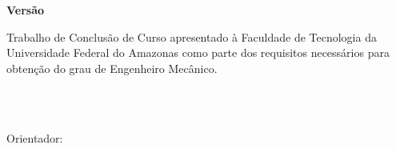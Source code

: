 
\thispagestyle{empty}
\begin{titlepage}
\begin{center}
\MakeUppercase{\AUTOR}\\ %
\vspace{2.5cm}
\large{\textbf{\TITULO}}\\ %
\vspace{2cm}
\normalsize{\textbf{Versão \VERSAO}} %
\vspace{2cm}
\end{center}

\begin{flushright}
\begin{minipage}{0.6\textwidth}
{\noindent Trabalho de Conclusão de Curso apresentado à Faculdade de Tecnologia da Universidade Federal do Amazonas como parte dos requisitos necessários para obtenção do grau de Engenheiro Mecânico.} %
\\ \\
\end{minipage}
\end{flushright}

\begin{minipage}{0.69\textwidth}
\end{minipage}
\\

\hspace{.2\textwidth} %
\begin{minipage}{0.69\textwidth}
{Orientador: \ORIENTADOR}\\
\end{minipage}
\vfill
\vspace{1.5cm}
\begin{center}
\large{\LOCAL\\\ANO}
\end{center}
\end{titlepage}
\pagebreak


